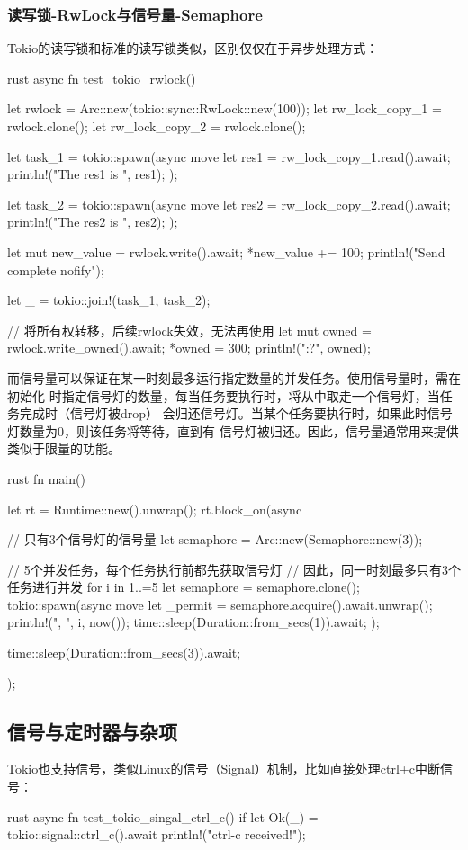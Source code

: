 \subsubsection{读写锁-RwLock与信号量-Semaphore}
Tokio的读写锁和标准的读写锁类似，区别仅仅在于异步处理方式：
\begin{code-block}{rust}
async fn test_tokio_rwlock() {
    let rwlock = Arc::new(tokio::sync::RwLock::new(100));
    let rw_lock_copy_1 = rwlock.clone();
    let rw_lock_copy_2 = rwlock.clone();

    let task_1 = tokio::spawn(async move {
        let res1 = rw_lock_copy_1.read().await;
        println!("The res1 is {}", res1);
    });

    let task_2 = tokio::spawn(async move {
        let res2 = rw_lock_copy_2.read().await;
        println!("The res2 is {}", res2);
    });

    {
        let mut new_value = rwlock.write().await;
        *new_value += 100;
        println!("Send complete nofify");
    }

    let _ = tokio::join!(task_1, task_2);

    // 将所有权转移，后续rwlock失效，无法再使用
    let mut owned = rwlock.write_owned().await;
    *owned = 300;
    println!("{:?}", owned);
}
\end{code-block}

而信号量可以保证在某一时刻最多运行指定数量的并发任务。使用信号量时，需在初始化
时指定信号灯的数量，每当任务要执行时，将从中取走一个信号灯，当任务完成时（信号灯被drop）
会归还信号灯。当某个任务要执行时，如果此时信号灯数量为0，则该任务将等待，直到有
信号灯被归还。因此，信号量通常用来提供类似于限量的功能。
\begin{code-block}{rust}
fn main() {
    let rt = Runtime::new().unwrap();
    rt.block_on(async {
        // 只有3个信号灯的信号量
        let semaphore = Arc::new(Semaphore::new(3));

        // 5个并发任务，每个任务执行前都先获取信号灯
        // 因此，同一时刻最多只有3个任务进行并发
        for i in 1..=5 {
            let semaphore = semaphore.clone();
            tokio::spawn(async move {
                let _permit = semaphore.acquire().await.unwrap();
                println!("{}, {}", i, now());
                time::sleep(Duration::from_secs(1)).await;
            });
        }

        time::sleep(Duration::from_secs(3)).await;
    });
}
\end{code-block}

\subsection{信号与定时器与杂项}
Tokio也支持信号，类似Linux的信号（Signal）机制，比如直接处理ctrl+c中断信号：
\begin{code-block}{rust}
async fn test_tokio_singal_ctrl_c() {
    if let Ok(_) = tokio::signal::ctrl_c().await {
        println!("ctrl-c received!");
    }
}
\end{code-block}

